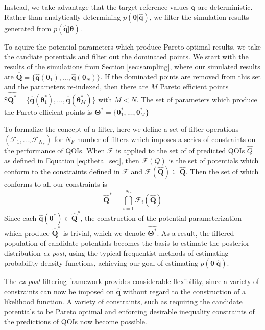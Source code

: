 Instead, we take advantage that the target reference values $\bm{q}$ are deterministic.  Rather than analytically determining $p(\bm{\theta}|\hat{\bm{q}})$, we filter the simulation results generated from $p(\hat{\bm{q}}|\bm{\theta})$.

To aquire the potential parameters which produce Pareto optimal results, we take the candiate potentials and filter out the dominated points.  We start with the results of the simulations from Section \ref{sec:sampling}, where our simulated results are $\hat{\bm{Q}}= \{\hat{\bm{q}}(\bm{\theta}_1),...,\hat{\bm{q}}(\bm{\theta}_N)\}$.
 If the dominated points are removed from this set and the parameters re-indexed, then there are $M$ Pareto efficient points
 $\$\hat{\bm{Q}^*}
  = \{\hat{\bm{q}}(\bm{\theta}_1^*)
	  ,...
		,\hat{\bm{q}}(\bm{\theta}_M^*)\}$
  with $M < N$.  The set of parameters which produce the Pareto efficient points is
	$\bm{\Theta}^*=\{\bm{\theta}_1^*,...,\bm{\theta}_M^*\}$

To formalize the concept of a filter, here we define a set of filter operations $(\mathcal{F}_1,...,\mathcal{F}_{N_F})$ for $N_F$ number of filters which imposes a series of constraints on the performance of QOIs.  When $\mathcal{F}$ is applied to the set of of predicted QOIs $\hat{Q}$ as defined in Equation \ref{eq:theta_seq}, then $\mathcal{F}(Q)$ is the set of potentials which conform to the constraints defined in $\mathcal{F}$ and $\mathcal{F}(\hat{\bm{Q}}) \subseteq \hat{\bm{Q}}$.
Then the set of which conforms to all our constraints is
\begin{equation}
  \hat{\bm{Q}}^*
	=
	\bigcap_{i=1}^{N_F} \mathcal{F}_i(\hat{\bm{Q}})
\end{equation}
Since each  $\hat{\bm{q}}(\bm{\theta}^*) \in \hat{\bm{Q}}^*$, the construction of the potential parameterization which produce $\hat{\bm{Q}}^*$ is trivial, which we denote  $\hat{\bm{\Theta}^*}$.
As a result, the filtered population of candidate potentials becomes the basis to estimate the posterior distribution \emph{ex post}, using the typical frequentist methods of estimating probability density functions, achieving our goal of estimating $p(\bm{\theta}|\hat{\bm{q}})$.

The \emph{ex post} filtering framework provides considerable flexibility, since a variety of constraints can now be imposed on $\hat{\bm{q}}$ without regard to the construction of a likelihood function.
A variety of constraints, such as requiring the candidate potentials to be Pareto optimal and enforcing desirable inequality constraints of the predictions of QOIs now become possible.

